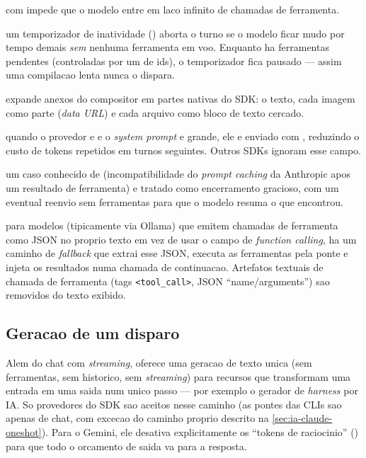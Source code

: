 \begin{description}[leftmargin=0pt, style=nextline]
  \item[Limite de passos]  com  impede que o modelo entre em laco infinito de chamadas de ferramenta.
  \item[Anti-congelamento] um temporizador de inatividade () aborta o turno se o modelo ficar mudo por tempo demais \emph{sem} nenhuma ferramenta em voo. Enquanto ha ferramentas pendentes (controladas por um  de ids), o temporizador fica pausado --- assim uma compilacao lenta nunca o dispara.
  \item[Conteudo multimodal]  expande anexos do compositor em partes nativas do SDK: o texto, cada imagem como parte  (\emph{data URL}) e cada arquivo como bloco de texto cercado.
  \item[\emph{Prompt caching} da Anthropic] quando o provedor e  e o \emph{system prompt} e grande, ele e enviado com , reduzindo o custo de tokens repetidos em turnos seguintes. Outros SDKs ignoram esse campo.
  \item[Compatibilidade] um caso conhecido de  (incompatibilidade do \emph{prompt caching} da Anthropic apos um resultado de ferramenta) e tratado como encerramento gracioso, com um eventual reenvio sem ferramentas para que o modelo resuma o que encontrou.
  \item[Ferramentas em texto] para modelos (tipicamente via Ollama) que emitem chamadas de ferramenta como JSON no proprio texto em vez de usar o campo de \emph{function calling}, ha um caminho de \emph{fallback} que extrai esse JSON, executa as ferramentas pela ponte e injeta os resultados numa chamada de continuacao. Artefatos textuais de chamada de ferramenta (tags \lstinline|<tool_call>|, JSON \enquote{name/arguments}) sao removidos do texto exibido.
\end{description}

\subsection{Geracao de um disparo}

Alem do chat com \emph{streaming},  oferece uma geracao
de texto unica (sem ferramentas, sem historico, sem \emph{streaming}) para
recursos que transformam uma entrada em uma saida num unico passo --- por
exemplo o gerador de \emph{harness} por IA. So provedores do SDK sao aceitos
nesse caminho (as pontes das CLIs sao apenas de chat, com excecao do caminho
proprio descrito na \autoref{sec:ia-claude-oneshot}). Para o Gemini, ele
desativa explicitamente os \enquote{tokens de raciocinio}
() para que todo o orcamento de saida va para a resposta.


